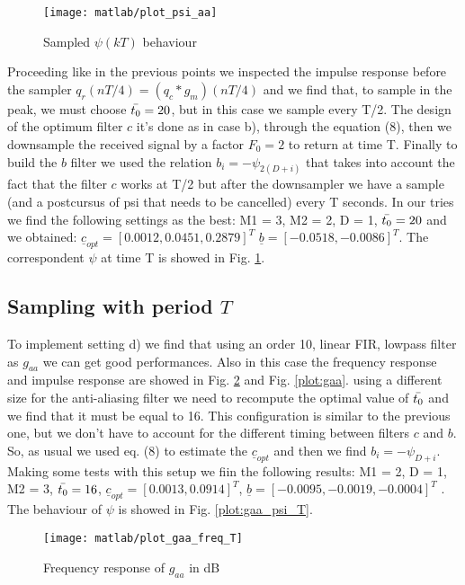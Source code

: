 \documentclass[a4paper,oneside]{article}
\renewcommand{\vec}[1]{\underline{#1}}
\begin{document}
\begin{figure}[h]
  \centering
  \texttt{[image: matlab/plot\_psi\_aa]}
  \caption{Sampled $\psi(kT)$ behaviour}
  \label{plot:psi_aa}
\end{figure}
Proceeding like in the previous points we inspected the impulse response before the sampler $q_r(n T/4) = (q_c * g_m)(n T/4)$ and we find that, to sample in the peak, we must choose $\Bar{t_0} = 20$, but in this case we sample every T/2. The design of the optimum filter $c$ it's done as in case b), through the equation (8), then we downsample the received signal by a factor $F_0 = 2$ to return at time T. Finally to build the $b$ filter we used the relation $b_i = - \psi_{2(D+i)}$ that takes into account the fact that the filter $c$ works at T/2 but after the downsampler we have a sample (and a postcursus of psi that needs to be cancelled) every T seconds. In our tries we find the following settings as the best: M1 = 3, M2 = 2, D = 1, $\Bar{t_0} = 20$ and we obtained: $\vec{c}_{opt} = [0.0012, 0.0451, 0.2879]^T$ $\vec{b} = [-0.0518, -0.0086]^T$. The correspondent $\psi$ at time T is showed in Fig. \ref{plot:psi_aa}.

\subsection{Sampling with period $T$}
To implement setting d) we find that using an order 10, linear FIR, lowpass filter as $g_{aa}$ we can get good performances. Also in this case the frequency response and impulse response are showed in Fig. \ref{plot:gaa_freq_T} and Fig. \ref{plot:gaa}. using a different size for the anti-aliasing filter we need to recompute the optimal value of $\Bar{t_0}$ and we find that it must be equal to 16. This configuration is similar to the previous one, but we don't have to account for the different timing between filters $c$ and $b$. So, as usual we used eq. (8) to estimate the $\vec{c}_{opt}$ and then we find $b_i = -\psi_{D+i}$. Making some tests with this setup we fiin the following results: M1 = 2, D = 1, M2 = 3, $\Bar{t_0} = 16$, $\vec{c}_{opt} = [0.0013, 0.0914]^T$, $\vec{b} = [-0.0095, -0.0019, -0.0004]^T$ . The behaviour of $\psi$ is showed in Fig. \ref{plot:gaa_psi_T}.
\begin{figure}[h]
  \centering
  \texttt{[image: matlab/plot\_gaa\_freq\_T]}
  \caption{Frequency response of $g_{aa}$ in dB}
  \label{plot:gaa_freq_T}
\end{figure}
\end{document}
